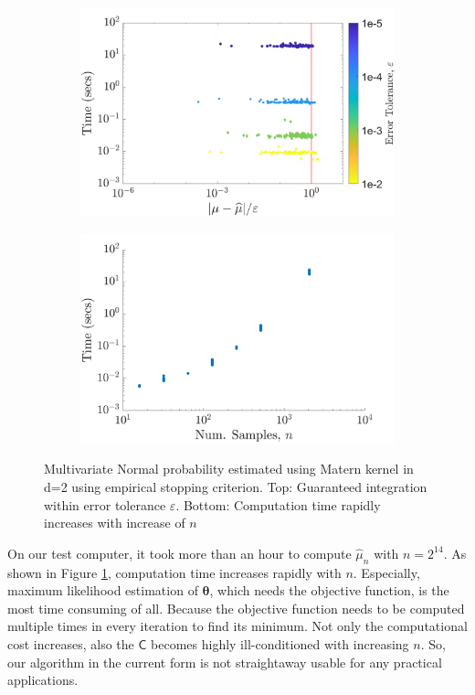 \documentclass[twocolumn]{svjour3}          %
\newcommand{\bm}[1]{\boldsymbol{#1}}
\newcommand{\vtheta}{{\bm{\theta}}}
\newcommand{\mC}{\mathsf{C}}
\newcommand{\hmu}{\widehat{\mu}}
\begin{document}
\begin{figure}
\captionsetup[subfigure]{labelformat=empty}
\centering
\begin{subfigure}[h]{0.8\linewidth}
\includegraphics[width=1.1\linewidth]{MVN_guaranteed_time_Matern_d2_2018-Aug-31}
\end{subfigure}
\centering
\begin{subfigure}[h]{0.8\linewidth}
\includegraphics[width=1.1\linewidth]{MVN_rapid_n_vs_time_Matern_d2_2018-Aug-31}
\end{subfigure}
\caption{Multivariate Normal probability estimated using Matern kernel in d=2 using empirical stopping criterion. Top: Guaranteed integration within error tolerance $\varepsilon$. Bottom: Computation time rapidly increases with increase of $n$}
\label{fig:MVN_Metern_d2b2}
\end{figure}

On our test computer, it took more than an hour to compute $\hmu_n$ with $n=2^{14}$. As shown in Figure \ref{fig:MVN_Metern_d2b2}, computation time increases rapidly with $n$. 
Especially, maximum likelihood estimation of $\vtheta$, which needs the objective function, is the most time consuming of all. 
Because the objective function needs to be computed multiple times in every iteration to find its minimum. 
Not only the computational cost increases, also the $\mC$ becomes highly ill-conditioned with increasing $n$.
So, our algorithm in the current form is not straightaway usable for any practical applications.
\end{document}
